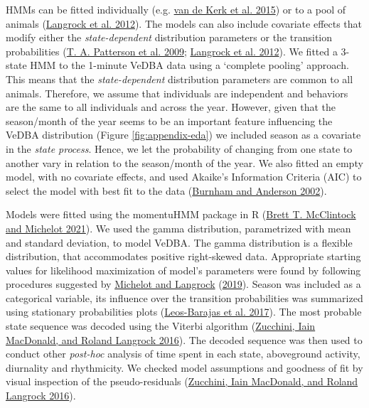\documentclass[msc,numbers,hidelinks]{coppe}
\begin{document}
  HMMs can be fitted individually (e.g. \protect\hyperlink{ref-vandekerk2015}{van de Kerk et al. 2015}) or to a pool of animals (\protect\hyperlink{ref-langrock2012}{Langrock et al. 2012}). The models can also include covariate effects that modify either the \emph{state-dependent} distribution parameters or the transition probabilities (\protect\hyperlink{ref-patterson2009}{T. A. Patterson et al. 2009}; \protect\hyperlink{ref-langrock2012}{Langrock et al. 2012}). We fitted a 3-state HMM to the 1-minute VeDBA data using a `complete pooling' approach. This means that the \emph{state-dependent} distribution parameters are common to all animals. Therefore, we assume that individuals are independent and behaviors are the same to all individuals and across the year. However, given that the season/month of the year seems to be an important feature influencing the VeDBA distribution (Figure \ref{fig:appendix-eda}) we included season as a covariate in the \emph{state process}. Hence, we let the probability of changing from one state to another vary in relation to the season/month of the year. We also fitted an empty model, with no covariate effects, and used Akaike's Information Criteria (AIC) to select the model with best fit to the data (\protect\hyperlink{ref-burnham2002}{Burnham and Anderson 2002}).

  Models were fitted using the momentuHMM package in R (\protect\hyperlink{ref-mcclintock2021}{Brett T. McClintock and Michelot 2021}). We used the gamma distribution, parametrized with mean and standard deviation, to model VeDBA. The gamma distribution is a flexible distribution, that accommodates positive right-skewed data. Appropriate starting values for likelihood maximization of model's parameters were found by following procedures suggested by \protect\hyperlink{ref-michelot2019}{Michelot and Langrock} (\protect\hyperlink{ref-michelot2019}{2019}). Season was included as a categorical variable, its influence over the transition probabilities was summarized using stationary probabilities plots (\protect\hyperlink{ref-leosbarajas2017}{Leos-Barajas et al. 2017}). The most probable state sequence was decoded using the Viterbi algorithm (\protect\hyperlink{ref-zucchini2016}{Zucchini, Iain MacDonald, and Roland Langrock 2016}). The decoded sequence was then used to conduct other \emph{post-hoc} analysis of time spent in each state, aboveground activity, diurnality and rhythmicity. We checked model assumptions and goodness of fit by visual inspection of the pseudo-residuals (\protect\hyperlink{ref-zucchini2016}{Zucchini, Iain MacDonald, and Roland Langrock 2016}).
\end{document}
